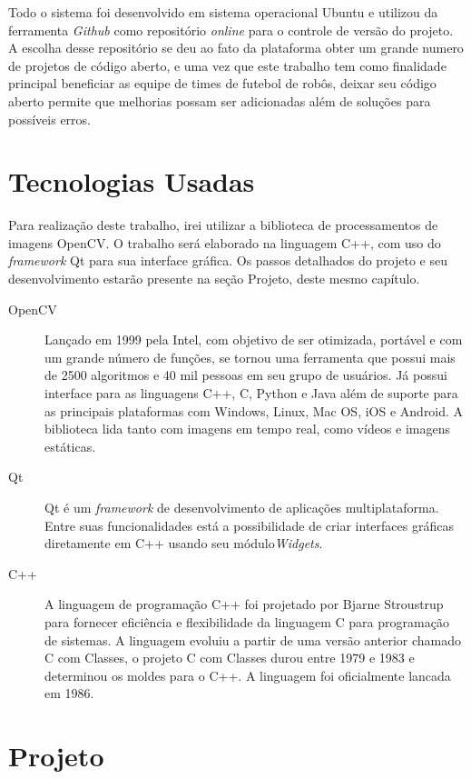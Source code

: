 			Todo o sistema foi desenvolvido em sistema operacional Ubuntu e utilizou da ferramenta {\it Github} como repositório {\it online} para o controle de versão do projeto. A escolha desse repositório se deu ao fato da plataforma obter um grande numero de projetos de código aberto, e uma vez que este trabalho tem como finalidade principal beneficiar as equipe de times de futebol de robôs, deixar seu código aberto permite que melhorias possam ser adicionadas além de soluções para possíveis erros.
			
\section{Tecnologias Usadas}
Para realização deste trabalho, irei utilizar a biblioteca de processamentos de imagens OpenCV. O trabalho será elaborado na linguagem C++, com uso do {\it framework} Qt para sua interface gráfica.
Os passos detalhados do projeto e seu desenvolvimento estarão presente na seção Projeto, deste mesmo capítulo.
\begin{description}
	\item[OpenCV] Lançado em 1999 pela Intel\cite{Culjak:2012}, com objetivo de ser otimizada, portável e com um grande número de funções, se tornou uma ferramenta que possui mais de 2500 algoritmos e 40 mil pessoas em seu grupo de usuários\cite{Culjak:2012}. Já possui interface para as linguagens C++, C, Python e Java além de suporte para as principais plataformas com Windows, Linux, Mac OS, iOS e Android. A biblioteca lida tanto com imagens em tempo real, como vídeos e imagens estáticas.
	
	\item[Qt] Qt é um {\it framework} de desenvolvimento de aplicações multiplataforma. Entre suas funcionalidades está a possibilidade de criar interfaces gráficas diretamente em C++ usando seu módulo{\it  Widgets}.
	
	\item [C++] A linguagem de programação C++ foi projetado por Bjarne Stroustrup para fornecer eficiência e flexibilidade da linguagem C para programação de sistemas. A linguagem evoluiu a partir de uma versão anterior chamado C com Classes, o projeto C com Classes durou entre 1979 e 1983 e determinou os moldes para o C++. A linguagem foi oficialmente lancada em 1986\cite{Stroustrup:1996}.
\end{description}

\section{Projeto}
